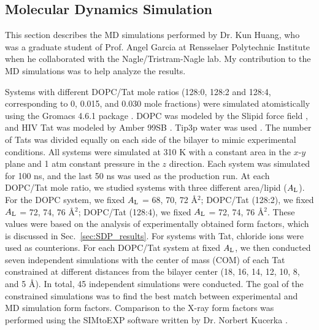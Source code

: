 \subsection{Molecular Dynamics Simulation}\label{sec:sim_methods}
This section describes the MD simulations performed by Dr. Kun Huang, who was
a graduate student of Prof. Angel Garcia at Rensselaer Polytechnic Institute
when he collaborated with the Nagle/Tristram-Nagle lab.
My contribution to the MD simulations was to help analyze the results.

Systems with different DOPC/Tat mole ratios (128:0, 128:2 and 128:4, corresponding to
0, 0.015, and 0.030 mole fractions) were simulated atomistically using the Gromacs 4.6.1
package \cite{Hess08}. 
DOPC was modeled by the Slipid force field 
\cite{Jambeck12_JPCB,Jambeck12_JCTC},
and HIV Tat was modeled by Amber 99SB \cite{Hornak06}. 
Tip3p water was used \cite{Jorgensen83}. The number of Tats was divided equally on
each side of the bilayer to mimic experimental conditions. All systems were simulated at 310 K
with a constant area in the $x$-$y$ plane and 1 atm constant pressure in the $z$ direction. Each
system was simulated for 100 ns, and the last 50 ns was used as the production run.
At each DOPC/Tat mole ratio, we studied systems with three different area/lipid ($A_\textrm{L}$).
For the DOPC system, we fixed $A_\textrm{L}$ = 68, 70, 72 \AA$^2$; 
DOPC/Tat (128:2), we fixed $A_\textrm{L}$ = 72, 74, 76 \AA$^2$; 
DOPC/Tat (128:4), we fixed $A_\textrm{L}$ = 72, 74, 76 \AA$^2$. 
These values were based on the analysis of experimentally obtained form 
factors, which is discussed in Sec.~\ref{sec:SDP_results}.
For systems with Tat, chloride ions were used as counterions.
For each DOPC/Tat system at fixed $A_\textrm{L}$, 
we then conducted seven independent simulations with the center of mass (COM) of
each Tat constrained at different distances from the bilayer center 
(18, 16, 14, 12, 10, 8, and 5 \AA). 
In total, 45 independent simulations were conducted. 
The goal of the constrained simulations was to find the best match between 
experimental and MD simulation form factors. Comparison to
the X-ray form factors was performed using the SIMtoEXP software 
written by Dr. Norbert Kucerka \cite{Kucerka10}. 

